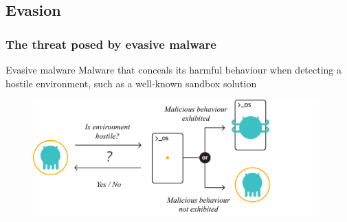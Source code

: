 \documentclass[compress]{beamer}
\begin{document}

\subsection{Evasion}
\begin{frame}
    \frametitle{The threat posed by evasive malware}
	
		    \begin{beamerboxesrounded}[shadow=true]{Evasive malware}
Malware that conceals its harmful behaviour when detecting a
hostile environment, such as a well-known sandbox
solution
    \end{beamerboxesrounded}
    \bigskip
    
    \begin{figure}
    	\vspace{-0.6cm}
    	\hspace*{0.5cm}
        \includegraphics[width=11cm]{image/evasive.pdf}
    \end{figure}
    
\end{frame}
\end{document}

